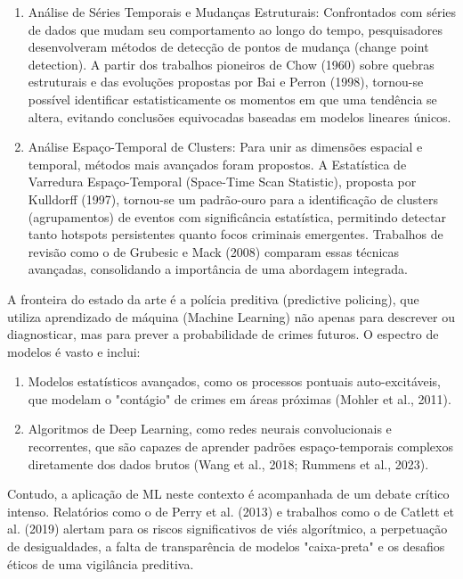 \begin{enumerate}
  \item{Análise de Séries Temporais e Mudanças Estruturais: Confrontados com séries de dados que mudam seu comportamento ao longo do tempo, pesquisadores desenvolveram métodos de detecção de pontos de mudança (change point detection). A partir dos trabalhos pioneiros de Chow (1960) sobre quebras estruturais e das evoluções propostas por Bai e Perron (1998), tornou-se possível identificar estatisticamente os momentos em que uma tendência se altera, evitando conclusões equivocadas baseadas em modelos lineares únicos.}
  \item{Análise Espaço-Temporal de Clusters: Para unir as dimensões espacial e temporal, métodos mais avançados foram propostos. A Estatística de Varredura Espaço-Temporal (Space-Time Scan Statistic), proposta por Kulldorff (1997), tornou-se um padrão-ouro para a identificação de clusters (agrupamentos) de eventos com significância estatística, permitindo detectar tanto hotspots persistentes quanto focos criminais emergentes. Trabalhos de revisão como o de Grubesic e Mack (2008) comparam essas técnicas avançadas, consolidando a importância de uma abordagem integrada.}
\end{enumerate}

A fronteira do estado da arte é a polícia preditiva (predictive policing), que utiliza aprendizado de máquina (Machine Learning) não apenas para descrever ou diagnosticar, mas para prever a probabilidade de crimes futuros. O espectro de modelos é vasto e inclui:

\begin{enumerate}
  \item{Modelos estatísticos avançados, como os processos pontuais auto-excitáveis, que modelam o "contágio" de crimes em áreas próximas (Mohler et al., 2011).}
  \item{Algoritmos de Deep Learning, como redes neurais convolucionais e recorrentes, que são capazes de aprender padrões espaço-temporais complexos diretamente dos dados brutos (Wang et al., 2018; Rummens et al., 2023).}
\end{enumerate}

Contudo, a aplicação de ML neste contexto é acompanhada de um debate crítico intenso. Relatórios como o de Perry et al. (2013) e trabalhos como o de Catlett et al. (2019) alertam para os riscos significativos de viés algorítmico, a perpetuação de desigualdades, a falta de transparência de modelos "caixa-preta" e os desafios éticos de uma vigilância preditiva.

